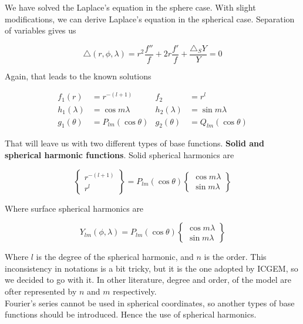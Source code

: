 We have solved the Laplace's equation in the sphere case. With slight modifications, we can derive Laplace's equation in the spherical case. Separation of variables gives us

\begin{equation}
\triangle (r, \phi, \lambda) = r^2 \frac{f''}{f} + 2r \frac{f'}{f} + \frac{\triangle_S Y}{Y} = 0
\end{equation}

Again, that leads to the known solutions

\begin{align*}
f_1(r) &= r^{-(l+1)} & f_2 &= r^l\\
h_1(\lambda) &= \cos m \lambda & h_2(\lambda) &= \sin m \lambda\\
g_1({\theta}) &= P_{lm}(\cos \theta) & g_2(\theta) &= Q_{lm}(\cos \theta)
\end{align*}

That will leave us with two different types of base functions. \textbf{Solid and spherical harmonic functions}. Solid spherical harmonics are

\begin{equation}
	\begin{Bmatrix}
	r^{-(l+1)} \\
	r^l
	\end{Bmatrix} = P_{lm}(\cos \theta)
		\begin{Bmatrix}
		\cos m \lambda \\
		\sin m \lambda
		\end{Bmatrix}
\end{equation}

Where surface spherical harmonics are

\begin{equation}
	Y_{lm}(\phi, \lambda) = P_{lm}(\cos \theta)
	\begin{Bmatrix}
		\cos m \lambda\\
		\sin m \lambda
	\end{Bmatrix}
\end{equation}

Where $l$ is the degree of the spherical harmonic, and $n$ is the order. This inconsistency in notations is a bit tricky, but it is the one adopted by ICGEM, so we decided to go with it. In other literature, degree and order, of the model are ofter represented by $n$ and $m$ respectively.
\\
Fourier's series cannot be used in spherical coordinates, so another types of base functions should be introduced. Hence the use of spherical harmonics.

